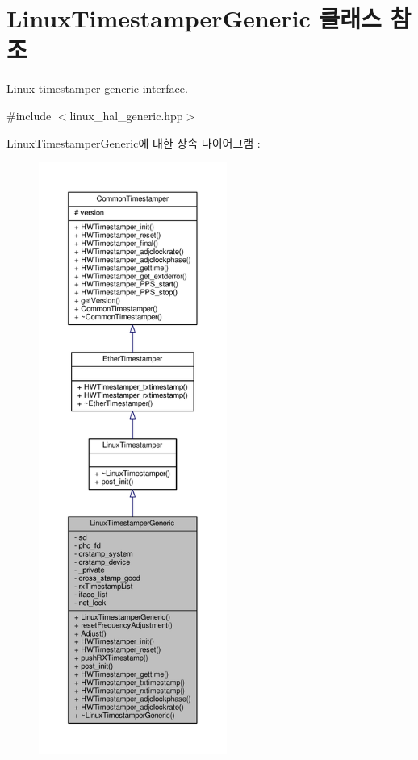 \hypertarget{class_linux_timestamper_generic}{}\section{Linux\+Timestamper\+Generic 클래스 참조}
\label{class_linux_timestamper_generic}


Linux timestamper generic interface.  




{\ttfamily \#include $<$linux\+\_\+hal\+\_\+generic.\+hpp$>$}



Linux\+Timestamper\+Generic에 대한 상속 다이어그램 \+: 
\nopagebreak
\begin{figure}[H]
\begin{center}
\leavevmode
\includegraphics[height=550pt]{class_linux_timestamper_generic__inherit__graph}
\end{center}
\end{figure}


